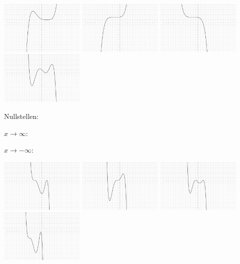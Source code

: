 \documentclass[12pt, parskip=half, a4paper, oneside]{scrartcl}
\begin{document}
\includegraphics[width=4cm]{Bilder/G55}\hfill
\includegraphics[width=4cm]{Bilder/G56}\hfill
\includegraphics[width=4cm]{Bilder/G57}\hfill
\includegraphics[width=4cm]{Bilder/G58}

\begin{addmargin}[-2cm]{0pt}
Nullstellen:

$x\rightarrow\infty:$

$x\rightarrow-\infty:$
\end{addmargin}

\includegraphics[width=4cm]{Bilder/G59}\hfill
\includegraphics[width=4cm]{Bilder/G510}\hfill
\includegraphics[width=4cm]{Bilder/G511}\hfill
\includegraphics[width=4cm]{Bilder/G512}
\end{document}
